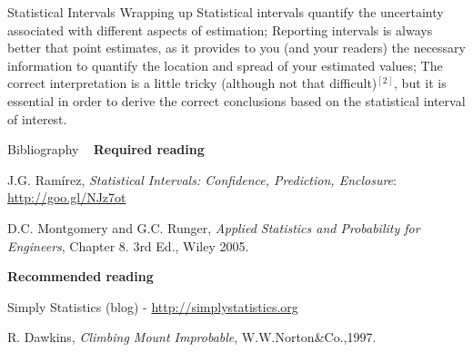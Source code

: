 \documentclass[t]{beamer}
\begin{document}

\begin{ftst}
{Statistical Intervals}
{Wrapping up}
Statistical intervals quantify the uncertainty associated with different aspects of estimation;
\vone
Reporting intervals is always better that point estimates, as it provides to you (and your readers) the necessary information to quantify the location and spread of your estimated values;
\vone
The correct interpretation is a little tricky (although not that difficult)$^{[2]}$, but it is essential in order to derive the correct conclusions based on the statistical interval of interest.
\end{ftst}



\begin{ftst}
{Bibliography}
{\ }
\scriptsize
\textbf{Required reading}

\benums J.G. Ram\'irez, \textit{Statistical Intervals: Confidence, Prediction, Enclosure}: \url{http://goo.gl/NJz7ot}
\item D.C. Montgomery and G.C. Runger, \textit{Applied Statistics and Probability for Engineers}, Chapter 8. 3rd Ed., Wiley 2005.
\eenum

\textbf{Recommended reading}

\benums Simply Statistics (blog) - \url{http://simplystatistics.org}
\item R. Dawkins, \textit{Climbing Mount Improbable}, W.W.Norton\&Co.,1997.
\eenum
\end{ftst}

\end{document}
